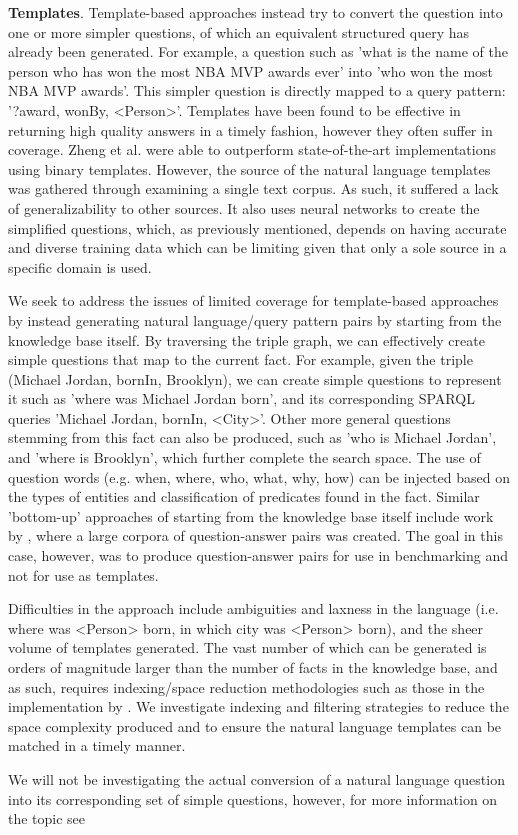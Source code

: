 \documentclass[sigplan,screen]{acmart}
\begin{document}
\textbf{Templates}. Template-based approaches instead try to convert the question into one or more simpler questions, of which an equivalent structured query has already been generated. For example, a question such as 'what is the name of the person who has won the most NBA MVP awards ever' into 'who won the most NBA MVP awards'. This simpler question is directly mapped to a query pattern: '?award, wonBy, <Person>'. Templates have been found to be effective in returning high quality answers in a timely fashion, however they often suffer in coverage. Zheng et al. were able to outperform state-of-the-art implementations using binary templates. However, the source of the natural language templates was gathered through examining a single text corpus. As such, it suffered a lack of generalizability to other sources. It also uses neural networks to create the simplified questions, which, as previously mentioned, depends on having accurate and diverse training data which can be limiting given that only a sole source in a specific domain is used.

We seek to address the issues of limited coverage for template-based approaches by instead generating natural language/query pattern pairs by starting from the knowledge base itself. By traversing the triple graph, we can effectively create simple questions that map to the current fact. For example, given the triple (Michael Jordan, bornIn, Brooklyn), we can create simple questions to represent it such as 'where was Michael Jordan born', and its corresponding SPARQL queries 'Michael Jordan, bornIn, <City>'. Other more general questions stemming from this fact can also be produced, such as 'who is Michael Jordan', and 'where is Brooklyn', which further complete the search space. The use of question words (e.g. when, where, who, what, why, how) can be injected based on the types of entities and classification of predicates found in the fact. Similar 'bottom-up' approaches of starting from the knowledge base itself include work by \citeauthor{generating-factoids}, where a large corpora of question-answer pairs was created. The goal in this case, however, was to produce question-answer pairs for use in benchmarking and not for use as templates.

Difficulties in the approach include ambiguities and laxness in the language (i.e. where was <Person> born, in which city was <Person> born), and the sheer volume of templates generated. The vast number of which can be generated is orders of magnitude larger than the number of facts in the knowledge base, and as such, requires indexing/space reduction methodologies such as those in the implementation by \citeauthor{zheng-question-over-knowledge-graph}. We investigate indexing and filtering strategies to reduce the space complexity produced and to ensure the natural language templates can be matched in a timely manner.

We will not be investigating the actual conversion of a natural language question into its corresponding set of simple questions, however, for more information on the topic see \cite{zheng-how-to-build-rdf-templates, automated-template-generation}

\nocite{*}


\end{document}
